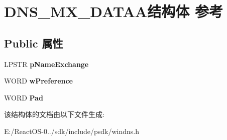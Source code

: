 \hypertarget{struct_d_n_s___m_x___d_a_t_a_a}{}\section{D\+N\+S\+\_\+\+M\+X\+\_\+\+D\+A\+T\+A\+A结构体 参考}
\label{struct_d_n_s___m_x___d_a_t_a_a}
\subsection*{Public 属性}
\begin{DoxyCompactItemize}
\item 
\mbox{\label{struct_d_n_s___m_x___d_a_t_a_a_a0313d3b9eedfc821c8131277eb621f0f}} 
L\+P\+S\+TR {\bfseries p\+Name\+Exchange}
\item 
\mbox{\label{struct_d_n_s___m_x___d_a_t_a_a_a031a6ebcc9aaf019099b12c6546af526}} 
W\+O\+RD {\bfseries w\+Preference}
\item 
\mbox{\label{struct_d_n_s___m_x___d_a_t_a_a_a071099cf242f18d08eec4d8375ee7245}} 
W\+O\+RD {\bfseries Pad}
\end{DoxyCompactItemize}


该结构体的文档由以下文件生成\+:\begin{DoxyCompactItemize}
\item 
E\+:/\+React\+O\+S-\/0../sdk/include/psdk/windns.\+h\end{DoxyCompactItemize}
